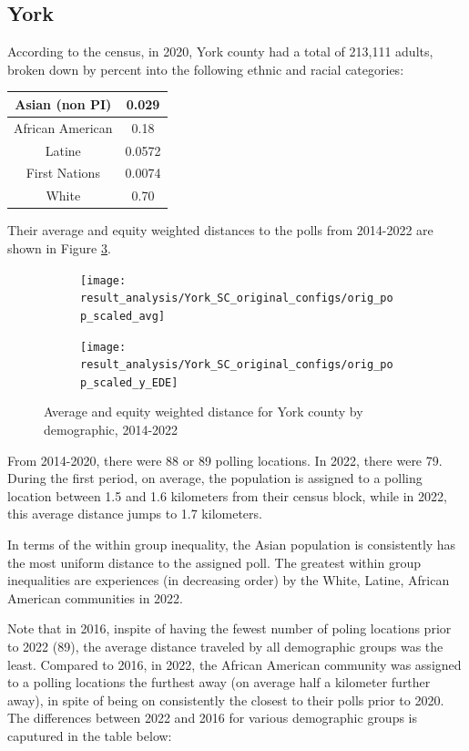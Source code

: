 \documentclass[11pt]{article}
\theoremstyle{remark}
\theoremstyle{definition}
\begin{document}
\subsection{York \label{sec:York distances}}
According to the census, in 2020, York county had a total of 213,111 adults, broken down by percent into the following ethnic and racial categories:

\begin{tabular} {| c | c |} 
\hline
 Asian (non PI) &  0.029 \\ \hline
African American & 0.18 \\ \hline
Latine & 0.0572 \\ \hline
First Nations & 0.0074 \\ \hline
White  & 0.70 \\ \hline
\end{tabular}

Their average and equity weighted distances to the polls from 2014-2022 are shown in Figure \ref{fig:York distance graphs}.

\begin{figure}
	\begin{subfigure}{.8\textwidth}
		\centering
		\texttt{[image: result\_analysis/York\_SC\_original\_configs/orig\_pop\_scaled\_avg]}
		\label{sfig:York avg dist}
	\end{subfigure} \newline
	\begin{subfigure}{.8\textwidth}
		\centering
		\texttt{[image: result\_analysis/York\_SC\_original\_configs/orig\_pop\_scaled\_y\_EDE]}
		\label{sfig:York equity dist}
	\end{subfigure}
	\caption{Average and equity weighted distance for York county by demographic, 2014-2022}
	\label{fig:York distance graphs}
\end{figure}

From 2014-2020, there were 88 or 89 polling locations. In 2022, there were 79. During the first period, on average, the population is assigned to a polling location between 1.5 and 1.6 kilometers from their census block, while in 2022, this average distance jumps to 1.7 kilometers. 

In terms of the within group inequality, the Asian population is consistently has the most uniform distance to the assigned poll. The greatest within group inequalities are experiences (in decreasing order) by the White, Latine, African American communities in 2022.

Note that in 2016, inspite of having the fewest number of poling locations prior to 2022 (89), the average distance traveled by all demographic groups was the least. Compared to 2016, in 2022, the African American community was assigned to a polling locations the furthest away (on average half a kilometer further away), in spite of being on consistently the closest to their polls prior to 2020. The differences between 2022 and 2016 for various demographic groups is caputured in the table below:
\end{document}
